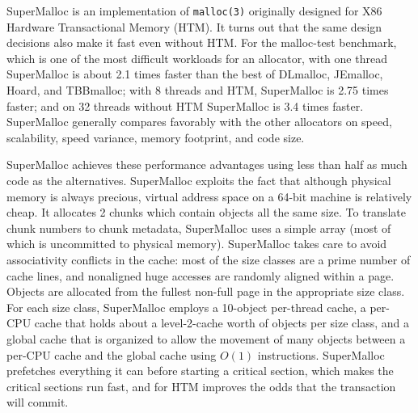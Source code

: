 SuperMalloc is an implementation of \texttt{malloc(3)} originally
designed for X86 Hardware Transactional Memory (HTM)\@.  It turns out
that the same design decisions also make it fast even without HTM\@.
For the malloc-test benchmark, which is one of the most difficult
workloads for an allocator, with one thread SuperMalloc is about 2.1
times faster than the best of DLmalloc, JEmalloc, Hoard, and
TBBmalloc; with 8 threads and HTM, SuperMalloc is 2.75 times faster;
and on 32 threads without HTM SuperMalloc is 3.4 times faster.
SuperMalloc generally compares favorably with the other allocators on
speed, scalability, speed variance, memory footprint, and code size.

SuperMalloc achieves these performance advantages using less than half
as much code as the alternatives.  SuperMalloc exploits the fact that
although physical memory is always precious, virtual address space on
a 64-bit machine is relatively cheap.  It allocates
\unit{2}\mebi\byte{} chunks which contain objects all the same size.
To translate chunk numbers to chunk metadata, SuperMalloc uses a
simple array (most of which is uncommitted to physical memory).
SuperMalloc takes care to avoid associativity conflicts in the cache:
most of the size classes are a prime number of cache lines, and
nonaligned huge accesses are randomly aligned within a page.  Objects
are allocated from the fullest non-full page in the appropriate size
class.  For each size class, SuperMalloc employs a 10-object
per-thread cache, a per-CPU cache that holds about a level-2-cache
worth of objects per size class, and a global cache that is organized
to allow the movement of many objects between a per-CPU cache and the
global cache using $O(1)$ instructions.  SuperMalloc prefetches
everything it can before starting a critical section, which makes the
critical sections run fast, and for HTM improves the odds that the
transaction will commit.
